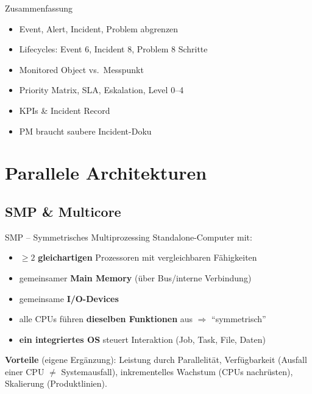 \documentclass[a4paper, fontsize=7pt]{scrartcl}
\begin{document}
\begin{subbox}{Zusammenfassung}
\begin{itemize}
    \item Event, Alert, Incident, Problem abgrenzen
    \item Lifecycles: Event 6, Incident 8, Problem 8 Schritte
    \item Monitored Object vs.\ Messpunkt
    \item Priority Matrix, SLA, Eskalation, Level 0--4
    \item KPIs \& Incident Record
    \item PM braucht saubere Incident-Doku
\end{itemize}
\end{subbox}

\section{Parallele Architekturen}

\subsection{SMP \& Multicore}

\begin{mainbox}{SMP -- Symmetrisches Multiprozessing}
Standalone-Computer mit:
\begin{itemize}
    \item $\ge 2$ \textbf{gleichartigen} Prozessoren mit vergleichbaren Fähigkeiten
    \item gemeinsamer \textbf{Main Memory} (über Bus/interne Verbindung)
    \item gemeinsame \textbf{I/O-Devices}
    \item alle CPUs führen \textbf{dieselben Funktionen} aus $\Rightarrow$
          ``symmetrisch''
    \item \textbf{ein integriertes OS} steuert Interaktion (Job, Task, File,
          Daten)
\end{itemize}
\textbf{Vorteile} (eigene Ergänzung): Leistung durch Parallelität,
Verfügbarkeit (Ausfall einer CPU $\neq$ Systemausfall), inkrementelles
Wachstum (CPUs nachrüsten), Skalierung (Produktlinien).
\end{mainbox}
\end{document}
